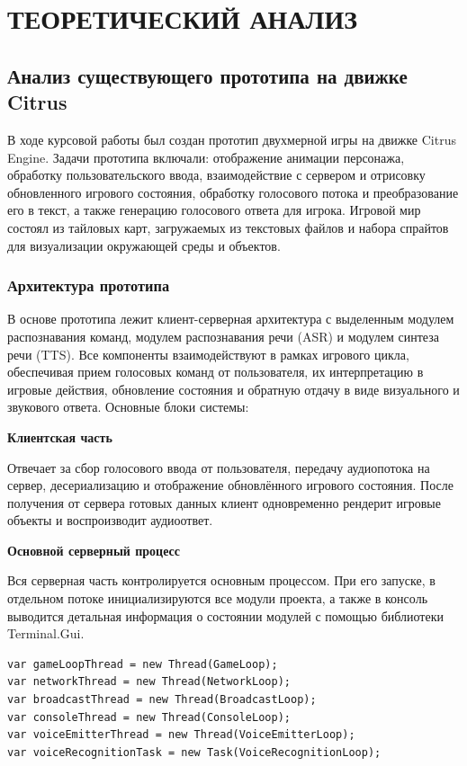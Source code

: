 \section{ТЕОРЕТИЧЕСКИЙ АНАЛИЗ}

    \subsection{Анализ существующего прототипа на движке Citrus}

        В ходе курсовой работы был создан прототип двухмерной игры на движке Citrus Engine. Задачи прототипа включали: отображение анимации персонажа, 
        обработку пользовательского ввода, взаимодействие с сервером и отрисовку обновленного игрового состояния, обработку голосового потока и преобразование его в текст,
        а также генерацию голосового ответа для игрока. Игровой мир состоял из тайловых карт, загружаемых из текстовых файлов и набора спрайтов для визуализации окружающей среды и объектов.
        
        \subsubsection{Архитектура прототипа}

        В основе прототипа лежит клиент-серверная архитектура с выделенным модулем распознавания команд, модулем распознавания речи (ASR) и модулем синтеза речи (TTS). 
        Все компоненты взаимодействуют в рамках игрового цикла, обеспечивая прием голосовых команд от пользователя, их интерпретацию в игровые действия, 
        обновление состояния и обратную отдачу в виде визуального и звукового ответа. Основные блоки системы:

        \textbf{Клиентская часть}
        
        Отвечает за сбор голосового ввода от пользователя, передачу аудиопотока на сервер, десериализацию и отображение обновлённого игрового состояния. 
        После получения от сервера готовых данных клиент одновременно рендерит игровые объекты и воспроизводит аудиоответ.

        \textbf{Основной серверный процесс}
        
        Вся серверная часть контролируется основным процессом. При его запуске, в отдельном потоке инициализируются все модули проекта, а также
        в консоль выводится детальная информация о состоянии модулей с помощью библиотеки Terminal.Gui.
        \begin{lstlisting}[caption=Инициализация модулей]
var gameLoopThread = new Thread(GameLoop);
var networkThread = new Thread(NetworkLoop);
var broadcastThread = new Thread(BroadcastLoop);
var consoleThread = new Thread(ConsoleLoop);
var voiceEmitterThread = new Thread(VoiceEmitterLoop);
var voiceRecognitionTask = new Task(VoiceRecognitionLoop);
        \end{lstlisting}

